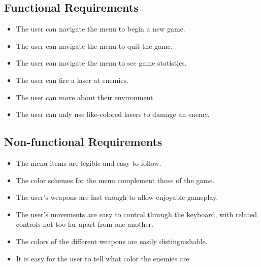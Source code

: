 \subsection*{Functional Requirements}
\begin{itemize}
    \item The user can navigate the menu to begin a new game.
    \item The user can navigate the menu to quit the game.
    \item The user can navigate the menu to see game statistics.
    \item The user can fire a laser at enemies.
    \item The user can move about their environment.
    \item The user can only use like-colored lasers to damage an enemy.
\end{itemize}

\subsection*{Non-functional Requirements}
\begin{itemize}
    \item The menu items are legible and easy to follow.
    \item The color schemes for the menu complement those of the game.
    \item The user's weapons are fast enough to allow enjoyable gameplay.
    \item The user's movements are easy to control through the keyboard,
          with related controls not too far apart from one another.
    \item The colors of the different weapons are easily distinguishable.
    \item It is easy for the user to tell what color the enemies are.
\end{itemize}
